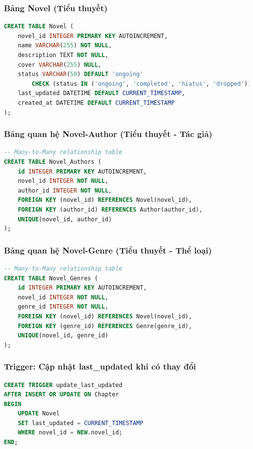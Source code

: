 \documentclass[12pt,aspectratio=169,handout]{beamer}
\begin{document}
\begin{frame}
\frametitle{Bảng Novel (Tiểu thuyết)}
\begin{lstlisting}[language=SQL, basicstyle=\small\ttfamily]
CREATE TABLE Novel (
    novel_id INTEGER PRIMARY KEY AUTOINCREMENT,
    name VARCHAR(255) NOT NULL,
    description TEXT NOT NULL,
    cover VARCHAR(255) NULL,
    status VARCHAR(50) DEFAULT 'ongoing' 
        CHECK (status IN ('ongoing', 'completed', 'hiatus', 'dropped')),
    last_updated DATETIME DEFAULT CURRENT_TIMESTAMP,
    created_at DATETIME DEFAULT CURRENT_TIMESTAMP
);
\end{lstlisting}
\end{frame}

\begin{frame}[fragile]
\frametitle{Bảng quan hệ Novel-Author (Tiểu thuyết - Tác giả)}
\begin{lstlisting}[language=SQL, basicstyle=\small\ttfamily]
-- Many-to-Many relationship table
CREATE TABLE Novel_Authors (
    id INTEGER PRIMARY KEY AUTOINCREMENT,
    novel_id INTEGER NOT NULL,
    author_id INTEGER NOT NULL,
    FOREIGN KEY (novel_id) REFERENCES Novel(novel_id),
    FOREIGN KEY (author_id) REFERENCES Author(author_id),
    UNIQUE(novel_id, author_id)
);
\end{lstlisting}
\end{frame}

\begin{frame}[fragile]
\frametitle{Bảng quan hệ Novel-Genre (Tiểu thuyết - Thể loại)}
\begin{lstlisting}[language=SQL, basicstyle=\small\ttfamily]
-- Many-to-Many relationship table
CREATE TABLE Novel_Genres (
    id INTEGER PRIMARY KEY AUTOINCREMENT,
    novel_id INTEGER NOT NULL,
    genre_id INTEGER NOT NULL,
    FOREIGN KEY (novel_id) REFERENCES Novel(novel_id),
    FOREIGN KEY (genre_id) REFERENCES Genre(genre_id),
    UNIQUE(novel_id, genre_id)
);
\end{lstlisting}
\end{frame}

\begin{frame}[fragile]
\frametitle{Trigger: Cập nhật last\_updated khi có thay đổi}
\begin{lstlisting}[language=SQL, basicstyle=\small\ttfamily]
CREATE TRIGGER update_last_updated
AFTER INSERT OR UPDATE ON Chapter
BEGIN
    UPDATE Novel
    SET last_updated = CURRENT_TIMESTAMP
    WHERE novel_id = NEW.novel_id;
END;
\end{lstlisting}
\end{frame}
\end{document}
